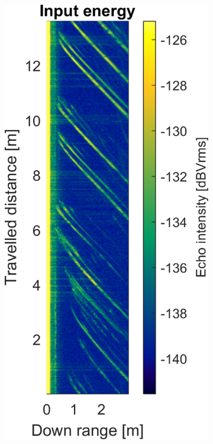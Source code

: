 \begin{figure}[htbp]
    \centering
    \begin{subfigure}[t]{0.475\linewidth}
        \centering
        \includegraphics[width=\linewidth,max height=.475\textheight]{gfx/results/publicrestroom_input.png}

\end{subfigure}
\end{figure}
